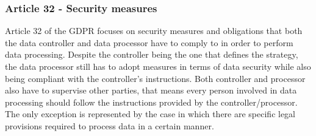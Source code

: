 \subsubsection{Article 32 - Security measures}
Article 32 of the GDPR focuses on security measures and obligations that both the data controller and data processor have to comply to in order to perform data processing. Despite the controller being the one that defines the strategy, the data processor still has to adopt measures in terms of data security while also being compliant with the controller's instructions. Both controller and processor also have to supervise other parties, that means every person involved in data processing should follow the instructions provided by the controller/processor. The only exception is represented by the case in which there are specific legal provisions required to process data in a certain manner.

